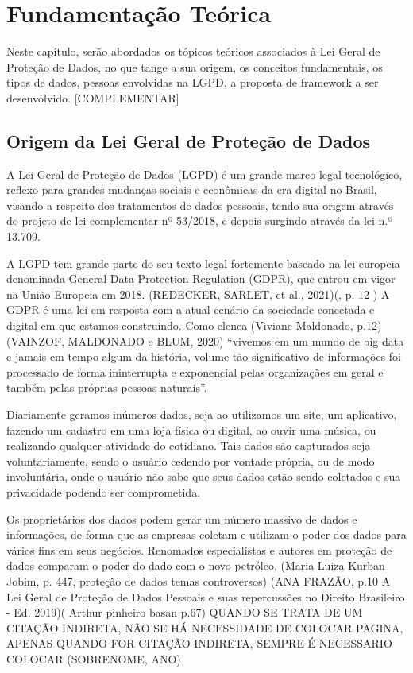 \documentclass[
	12pt,				%
	openright,			%
	oneside,			%
	a4paper,			%
	english,			%
	french,				%
	spanish,			%
	brazil,				%
	]{abntex2}
\begin{document}
\setcounter{chapter}{1}
\chapter{Fundamentação Teórica}
\label{ch: fundamentacao teorica}
Neste capítulo, serão abordados os tópicos teóricos associados à Lei Geral de Proteção de Dados, no que tange a sua origem, os conceitos fundamentais, os tipos de dados, pessoas envolvidas na LGPD, a proposta de framework a ser desenvolvido.
[COMPLEMENTAR]

\section{Origem da Lei Geral de Proteção de Dados}
\label{sec: exemplo}


A Lei Geral de Proteção de Dados (LGPD) é um grande marco legal tecnológico, reflexo para grandes mudanças sociais e econômicas da era digital no Brasil, visando a respeito dos tratamentos de dados pessoais, tendo sua origem através do projeto de lei complementar nº 53/2018, e depois surgindo através da lei n.º 13.709. 

A LGPD tem grande parte do seu texto legal fortemente baseado na lei europeia denominada General Data Protection Regulation (GDPR), que entrou em vigor na União Europeia em 2018. (REDECKER, SARLET, et al., 2021)(, p. 12 ) A GDPR é uma lei em resposta com a atual cenário da sociedade conectada e digital em que estamos construindo. Como elenca (Viviane Maldonado, p.12) (VAINZOF, MALDONADO e BLUM, 2020)  “vivemos em um mundo de big data e jamais em tempo algum da história, volume tão significativo de informações foi processado de forma ininterrupta e exponencial pelas organizações em geral e também pelas próprias pessoas naturais”.

Diariamente geramos inúmeros dados, seja ao utilizamos um site, um aplicativo, fazendo um cadastro em uma loja física ou digital, ao ouvir uma música, ou realizando qualquer atividade do cotidiano. Tais dados são capturados seja voluntariamente, sendo o usuário cedendo por vontade própria, ou de modo involuntária, onde o usuário não sabe que seus dados estão sendo coletados e sua privacidade podendo ser comprometida.

Os proprietários dos dados podem gerar um número massivo de dados e informações, de forma que as empresas coletam e utilizam o poder dos dados para vários fins em seus negócios. Renomados especialistas e autores em proteção de dados comparam o poder do dado com o novo petróleo. (Maria Luiza Kurban Jobim, p. 447, proteção de dados temas controversos) (ANA FRAZÃO, p.10 A Lei Geral de Proteção de Dados Pessoais e suas repercussões no Direito Brasileiro - Ed. 2019)( Arthur pinheiro basan p.67)  QUANDO SE TRATA DE UM CITAÇÃO INDIRETA, NÃO SE HÁ NECESSIDADE DE COLOCAR PAGINA, APENAS QUANDO FOR CITAÇÃO INDIRETA, SEMPRE É NECESSARIO COLOCAR (SOBRENOME, ANO) 
\end{document}
